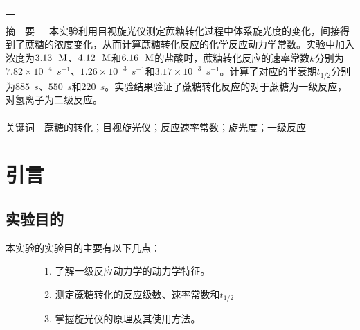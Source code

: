 \documentclass[12pt]{article}
\begin{document}
\begin{titlepage}
\begin{center}
            \begin{tabular*}{\textwidth}{c}
                \\ %
                \\ %
                \\ %
                \hline %
            \end{tabular*}
        \end{center}
        \textsf{\textcolor{BrickRed}{摘\ \ 要}}\ \  \  本实验利用目视旋光仪测定蔗糖转化过程中体系旋光度的变化，间接得到了蔗糖的浓度变化，从而计算蔗糖转化反应的化学反应动力学常数。实验中加入浓度为$3.13\ \ {\rm M}$、$4.12\ \ {\rm M}$和$6.16\ \ {\rm M}$的盐酸时，蔗糖转化反应的速率常数$k$分别为$7.82\times10^{-4}\ \ s^{-1}$、$1.26\times10^{-3}\ \ s^{-1}$和$3.17\times10^{-3}\ \ s^{-1}$。计算了对应的半衰期$t_{1/2}$分别为$885\ \ s$、$550\ \ s$和$220\ \ s$。实验结果验证了蔗糖转化反应的对于蔗糖为一级反应，对氢离子为二级反应。
        \\
        \\
        \textsf{\textcolor{BrickRed}{关键词}}\ \ 蔗糖的转化；目视旋光仪；反应速率常数；旋光度；一级反应
    \end{titlepage}

    \section{引言}
		\subsection{实验目的}
			本实验的实验目的主要有以下几点\citealp{physchemlab}：\par
			\ \ \ \ \ \ \ \ 1. 了解一级反应动力学的动力学特征。\par
			\ \ \ \ \ \ \ \	2. 测定蔗糖转化的反应级数、速率常数和$t_{1/2}$\par
			\ \ \ \ \ \ \ \	3. 掌握旋光仪的原理及其使用方法。\par

		\par
\end{document}
